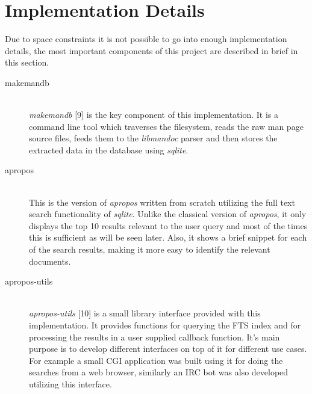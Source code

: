 \documentclass[titlepage, a4paper, 12pt]{article}
\begin{document}
\section{Implementation Details}
Due to space constraints it is not possible to go into enough implementation
details, the most important components of this project are described in brief
in this section.
\begin{description}
\item[makemandb] \hfill \\
\textit{makemandb} [9] is the key component of this implementation. It is a
command line tool which
traverses the filesystem, reads the raw man page source files, feeds them to the
\textit{libmandoc} parser and then stores the extracted data in the database
using \textit{sqlite}.
\end{description}
\begin{description}
\item[apropos] \hfill \\
This is the version of \textit{apropos} written from scratch utilizing the
full text search functionality of \textit{sqlite}. Unlike the classical version
of \textit{apropos}, it only displays the top 10 results relevant to the user
query and most of the times this is sufficient as will be seen later. Also, it
shows a brief snippet for each of the search results, making it more easy to
identify the relevant documents.
\end{description}
\begin{description}
\item[apropos-utils] \hfill \\
\textit{apropos-utils} [10] is a small library interface provided with this
implementation. It provides functions for querying the FTS index and for
processing the results in a user supplied callback function. It's main purpose
is to develop different interfaces on top of it for different
use cases. For example a small CGI application was built using it for doing
the searches from a web browser, similarly an IRC bot was also developed utilizing this interface.
\end{description}
\end{document}
